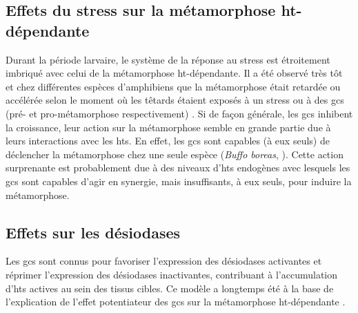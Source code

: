 \documentclass[../main.tex]{subfiles}
\begin{document}
		

	\subsection{Effets du stress sur la métamorphose \gls{ht}-dépendante}
		Durant la période larvaire, le système de la réponse au stress est étroitement imbriqué avec celui de la métamorphose \gls{ht}-dépendante.
		Il a été observé très tôt et chez différentes espèces d'amphibiens que la métamorphose était retardée ou accélérée selon le moment où les têtards étaient exposés à un stress ou à des \glspl{gc} (pré- et pro-métamorphose respectivement) \citep{Kobayashi1958,Kikuyama1983}.
		Si de façon générale, les \glspl{gc} inhibent la croissance, leur action sur la métamorphose semble en grande partie due à leurs interactions avec les \glspl{ht}.
		En effet, les \glspl{gc} sont capables (à eux seuls) de déclencher la métamorphose chez une seule espèce (\textit{Buffo boreas}, \citealp{Hayes1993a}).
		Cette action surprenante est probablement due à des niveaux d'\glspl{ht} endogènes avec lesquels les \glspl{gc} sont capables d'agir en synergie, mais insuffisants, à eux seuls, pour induire la métamorphose.

	\subsection{Effets sur les désiodases}
		Les \glspl{gc} sont connus pour favoriser l'expression des désiodases activantes et réprimer l'expression des désiodases inactivantes, contribuant à l'accumulation d'\glspl{ht} actives au sein des tissus cibles.
		Ce modèle a longtemps été à la base de l'explication de l'effet potentiateur des \glspl{gc} sur la métamorphose \gls{ht}-dépendante \citep{Galton1990}.
\end{document}
